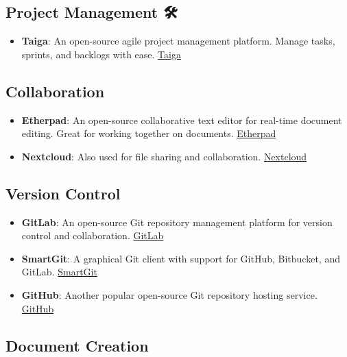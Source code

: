 \documentclass[
  letterpaper,
  DIV=11,
  numbers=noendperiod]{scrreprt}
\providecommand{\tightlist}{%
  \setlength{\itemsep}{0pt}\setlength{\parskip}{0pt}}\usepackage{longtable,booktabs,array}
\begin{document}
\subsection{Project Management 🛠️}\label{project-management-1}

\begin{itemize}
\tightlist
\item
  \textbf{Taiga}: An open-source agile project management platform.
  Manage tasks, sprints, and backlogs with ease.
  \href{https://www.taiga.io/}{Taiga}
\end{itemize}

\subsection{Collaboration 🤝}\label{collaboration-1}

\begin{itemize}
\item
  \textbf{Etherpad}: An open-source collaborative text editor for
  real-time document editing. Great for working together on documents.
  \href{https://etherpad.org/}{Etherpad}
\item
  \textbf{Nextcloud}: Also used for file sharing and collaboration.
  \href{https://nextcloud.com/}{Nextcloud}
\end{itemize}

\subsection{Version Control 🔄}\label{version-control-1}

\begin{itemize}
\item
  \textbf{GitLab}: An open-source Git repository management platform for
  version control and collaboration.
  \href{https://about.gitlab.com/}{GitLab}
\item
  \textbf{SmartGit}: A graphical Git client with support for GitHub,
  Bitbucket, and GitLab.
  \href{https://www.syntevo.com/smartgit/}{SmartGit}
\item
  \textbf{GitHub}: Another popular open-source Git repository hosting
  service. \href{https://github.com/}{GitHub}
\end{itemize}

\subsection{Document Creation 📄}\label{document-creation-1}
\end{document}
